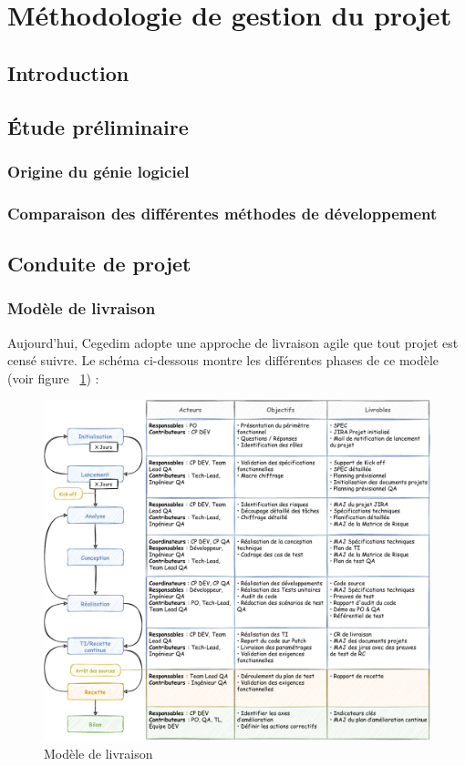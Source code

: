 \section{Méthodologie de gestion du projet}
\subsection{Introduction}
\subsection{Étude préliminaire}
\subsubsection{Origine du génie logiciel}
\subsubsection{Comparaison des différentes méthodes de développement}
\subsection{Conduite de projet}
\subsubsection{Modèle de livraison}
Aujourd'hui, Cegedim adopte une approche de livraison agile que tout projet est censé suivre. Le schéma ci-dessous montre les différentes phases de ce modèle (voir figure  ~\ref{fig:delivery}) :
\begin{figure}[H]
    \begin{center}
        \includegraphics[width=\linewidth]{images/sec3/deliveryprocess.pdf}
        \caption{Modèle de livraison}
        \label{fig:delivery}
    \end{center}
\end{figure}

